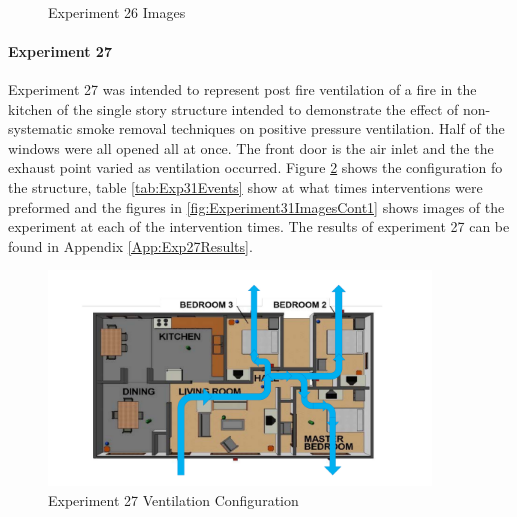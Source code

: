 \documentclass{article}
\begin{document}
\begin{figure}[H]
	\ContinuedFloat 
	\centering 
	 \ 
	\caption{Experiment 26 Images}
	\label{fig:Experiment30ImagesCont4} 
\end{figure}

\paragraph{Experiment 27} \mbox{}

Experiment 27 was intended to represent post fire ventilation of a fire in the kitchen of the single story structure intended to demonstrate the effect of non-systematic smoke removal techniques on positive pressure ventilation. Half of the windows were all opened all at once. The front door is the air inlet and the the exhaust point varied as ventilation occurred. Figure \ref{fig:Exp31VentConfig} shows the configuration fo the structure, table \ref{tab:Exp31Events} show at what times interventions were preformed and the figures in \ref{fig:Experiment31ImagesCont1} shows images of the experiment at each of the intervention times. The results of experiment 27 can be found in Appendix \ref{App:Exp27Results}.

\begin{figure} [H]
	\centering
	\includegraphics[width = 4in]{0_Images/Tactical_Considerations/Systematic_Vs_Non-Systematic/Non_Systematic.pdf}
	\caption{Experiment 27 Ventilation Configuration}
	\label{fig:Exp31VentConfig}
\end{figure}
\end{document}
